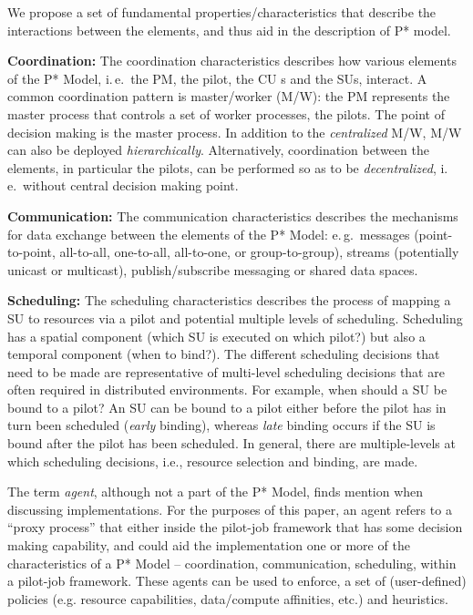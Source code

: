\documentclass[conference,final]{IEEEtran}
\newcommand{\jhanote}[1]{ {\textcolor{red} { ***shantenu: #1 }}}
\newcommand{\alnote}[1]{ {\textcolor{blue} { ***andre: #1 }}}
\newcommand{\alnote}[1]{}
\newcommand{\jhanote}[1]{}
\newcommand{\cu}{CU\xspace}
\begin{document}
We propose a set of fundamental properties/characteristics that
describe the interactions between the elements, and thus aid in the
description of P* model.


\textbf{Coordination:} The coordination characteristics describes how
various elements of the P* Model, i.\,e.\ the PM, the pilot, the \cu s
and the SUs, interact. A common coordination pattern is master/worker
(M/W): the PM represents the master process that controls a set of
worker processes, the pilots. The point of decision making is the
master process. In addition to the \emph{centralized} M/W, M/W can
also be deployed \emph{hierarchically}.  Alternatively, coordination
between the elements, in particular the pilots, can be performed so as
to be \emph{decentralized}, i.\,e.\ without central decision making
point.

%

\textbf{Communication:} The communication characteristics describes the
mechanisms for data exchange between the elements of the P* Model:
e.\,g.\ messages (point-to-point, all-to-all, one-to-all, all-to-one,
or group-to-group), streams (potentially unicast or multicast),
publish/subscribe messaging or shared data spaces.
		
\textbf{Scheduling:} The scheduling characteristics describes the
process of mapping a SU to resources via a pilot and potential
multiple levels of scheduling. Scheduling has a spatial component
(which SU is executed on which pilot?) but also a temporal component
(when to bind?). The different scheduling decisions that need to be
made are representative of multi-level scheduling decisions that are
often required in distributed environments.  For example, when should
a SU be bound to a pilot?  An SU can be bound to a pilot either before
the pilot has in turn been scheduled ({\it early} binding), whereas
{\it late} binding occurs if the SU is bound after the pilot has been
scheduled.  In general, there are multiple-levels at which scheduling
decisions, i.e., resource selection and binding, are made.

The term {\it agent}, although not a part of the P* Model, finds
mention when discussing implementations. For the purposes of this
paper, an agent refers to a ``proxy process'' that either inside the
pilot-job framework that has some decision making capability, and
could aid the implementation one or more of the characteristics of a
P* Model -- coordination, communication, scheduling, within a
pilot-job framework.  These agents can be used to enforce, a set of
(user-defined) policies (e.g.  resource capabilities, data/compute
affinities, etc.) and heuristics.
\end{document}
